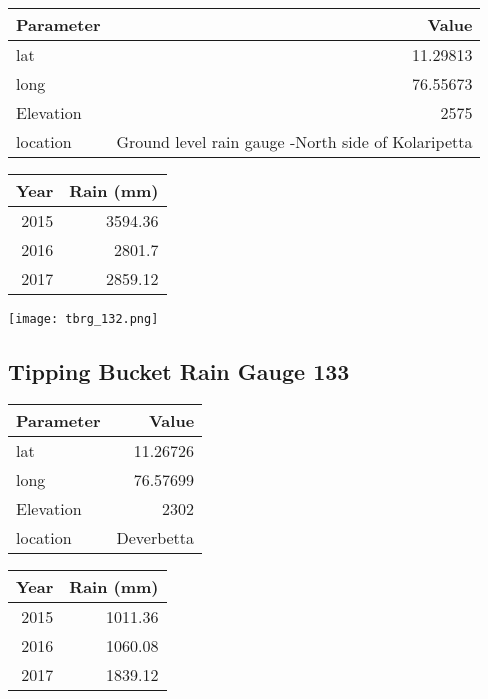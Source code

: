 \documentclass[a4paper]{article}
\begin{document}
\begin{center}
\begin{tabular}{lr}
Parameter & Value\\
\hline
lat & 11.29813\\
long & 76.55673\\
Elevation & 2575\\
location & Ground level rain gauge -North side of Kolaripetta\\
\end{tabular}
\end{center}

\begin{center}
\begin{tabular}{rr}
Year & Rain (mm)\\
\hline
2015 & 3594.36\\
2016 & 2801.7\\
2017 & 2859.12\\
\end{tabular}
\end{center}

\begin{center}
\texttt{[image: tbrg\_132.png]}
\end{center}

\newpage

\subsection*{Tipping Bucket Rain Gauge 133}
\label{sec:orgd61e99b}

\begin{center}
\begin{tabular}{lr}
Parameter & Value\\
\hline
lat & 11.26726\\
long & 76.57699\\
Elevation & 2302\\
location & Deverbetta\\
\end{tabular}
\end{center}

\begin{center}
\begin{tabular}{rr}
Year & Rain (mm)\\
\hline
2015 & 1011.36\\
2016 & 1060.08\\
2017 & 1839.12\\
\end{tabular}
\end{center}
\end{document}
